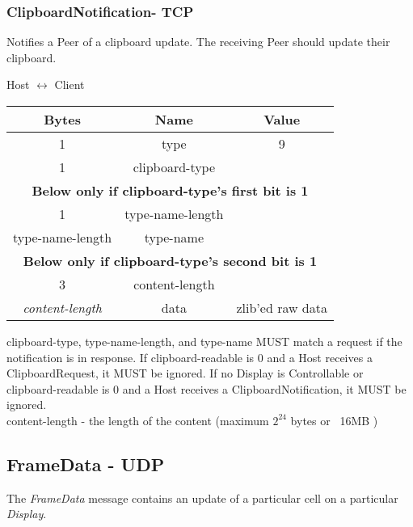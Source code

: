 \subsubsection{ClipboardNotification- TCP}

Notifies a Peer of a clipboard update. The receiving Peer should update their clipboard.

\begin{center}
    Host $\leftrightarrow$ Client\\
    \begin{tabular}{|c|c|c|}
        \hline
        \textbf{Bytes}        & \textbf{Name}    & \textbf{Value}   \\
        \hline
        1                     & type             & 9                \\
        \hline
        1                     & clipboard-type   &                  \\
        \hline
        \multicolumn{3}{|c|}{\textbf{Below only if clipboard-type's first bit is 1} } \\
        \hline
        1                     & type-name-length &                  \\
        \hline
        type-name-length      & type-name        &                  \\
        \hline
        \multicolumn{3}{|c|}{\textbf{Below only if clipboard-type's second bit is 1} } \\
        3                     & content-length   &                  \\
        \hline
        \emph{content-length} & data             & zlib'ed raw data \\
        \hline
    \end{tabular}
\end{center}


clipboard-type, type-name-length, and type-name MUST match a request if the notification is in response. If
clipboard-readable is 0 and a Host receives a ClipboardRequest, it MUST be ignored. If no Display is Controllable or
clipboard-readable is 0 and a Host receives a ClipboardNotification, it MUST be ignored.\\

content-length -  the length of the content  (maximum $2^{24}$ bytes or ~16MB )\\

\subsection{FrameData - UDP}
The \emph{FrameData} message contains an update of a particular cell on a particular \emph{Display}.

